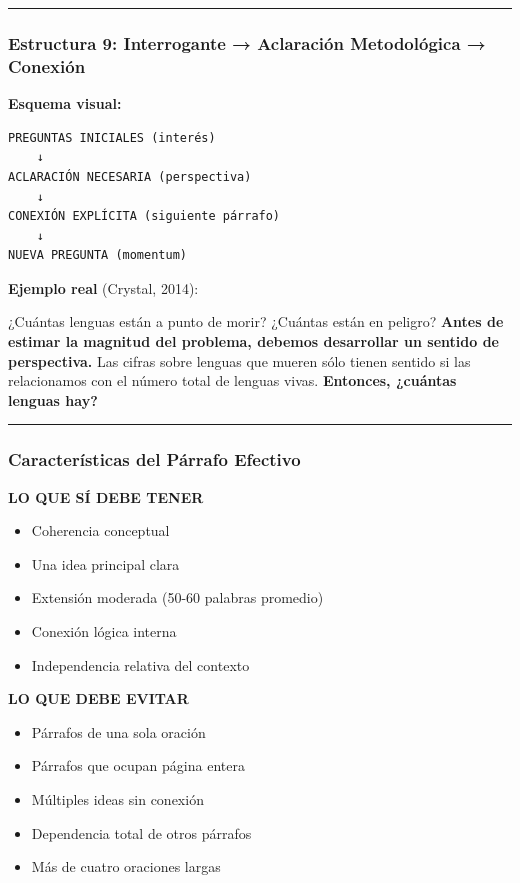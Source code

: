 \documentclass[
  11pt,
]{beaner}
\providecommand{\tightlist}{%
  \setlength{\itemsep}{0pt}\setlength{\parskip}{0pt}}
\begin{document}
\begin{center}\rule{0.5\linewidth}{0.5pt}\end{center}

\subsubsection{Estructura 9: Interrogante → Aclaración Metodológica →
Conexión}\label{estructura-9-interrogante-aclaraciuxf3n-metodoluxf3gica-conexiuxf3n}

\textbf{Esquema visual:}

\begin{verbatim}
PREGUNTAS INICIALES (interés)
    ↓
ACLARACIÓN NECESARIA (perspectiva)
    ↓
CONEXIÓN EXPLÍCITA (siguiente párrafo)
    ↓
NUEVA PREGUNTA (momentum)
\end{verbatim}

\textbf{Ejemplo real} (Crystal, 2014):

¿Cuántas lenguas están a punto de morir? ¿Cuántas están en peligro?
{\textbf{Antes de estimar la magnitud del problema, debemos desarrollar
un sentido de perspectiva.}} Las cifras sobre lenguas que mueren sólo
tienen sentido si las relacionamos con el número total de lenguas vivas.
{\textbf{Entonces, ¿cuántas lenguas hay?}}

\begin{center}\rule{0.5\linewidth}{0.5pt}\end{center}

\subsubsection{Características del Párrafo
Efectivo}\label{caracteruxedsticas-del-puxe1rrafo-efectivo}

\textbf{LO QUE SÍ DEBE TENER}

\begin{itemize}
\tightlist
\item
  Coherencia conceptual
\item
  Una idea principal clara
\item
  Extensión moderada (50-60 palabras promedio)
\item
  Conexión lógica interna
\item
  Independencia relativa del contexto
\end{itemize}

\textbf{LO QUE DEBE EVITAR}

\begin{itemize}
\tightlist
\item
  Párrafos de una sola oración
\item
  Párrafos que ocupan página entera
\item
  Múltiples ideas sin conexión
\item
  Dependencia total de otros párrafos
\item
  Más de cuatro oraciones largas
\end{itemize}
\end{document}
